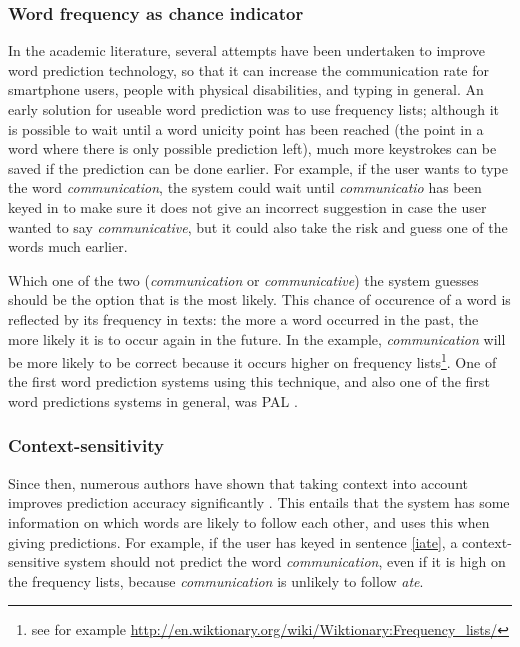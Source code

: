 \documentclass[11pt]{article}
\begin{document}
\subsubsection{Word frequency as chance indicator}

In the academic literature, several attempts have been undertaken to improve word prediction technology, so that it can increase the communication rate for smartphone users, people with physical disabilities, and typing in general. An early solution for useable word prediction was to use frequency lists; although it is possible to wait until a word unicity point has been reached (the point in a word where there is only possible prediction left), much more keystrokes can be saved if the prediction can be done earlier. For example, if the user wants to type the word \emph{communication}, the system could wait until \emph{communicatio} has been keyed in to make sure it does not give an incorrect suggestion in case the user wanted to say \emph{communicative}, but it could also take the risk and guess one of the words much earlier. 

Which one of the two (\emph{communication} or \emph{communicative}) the system guesses should be the option that is the most likely. This chance of occurence of a word is reflected by its frequency in texts: the more a word occurred in the past, the more likely it is to occur again in the future. In the example, \emph{communication} will be more likely to be correct because it occurs higher on frequency lists\footnote{see for example \url{http://en.wiktionary.org/wiki/Wiktionary:Frequency\_lists/}}. One of the first word prediction systems using this technique, and also one of the first word predictions systems in general, was PAL . 

\subsubsection{Context-sensitivity} \label{context-sensitivity}

Since then, numerous authors have shown that taking context into account improves prediction accuracy significantly \cite[among others]{Lesher+99,Garay-Vitoria+06,Tanaka-Ishii07,vandenbosch+08}. This entails that the system has some information on which words are likely to follow each other, and uses this when giving predictions. For example, if the user has keyed in sentence \ref{iate}, a context-sensitive system should not predict the word \emph{communication}, even if it is high on the frequency lists, because \emph{communication} is unlikely to follow \emph{ate}.
\end{document}
